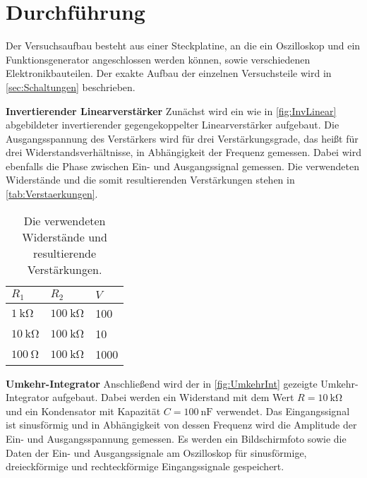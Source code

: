 \section{Durchführung}
Der Versuchsaufbau besteht aus einer Steckplatine, an die ein Oszilloskop und ein Funktionsgenerator angeschlossen werden können, sowie verschiedenen Elektronikbauteilen. Der exakte Aufbau der einzelnen Versuchsteile wird in \autoref{sec:Schaltungen} beschrieben.


\textbf{Invertierender Linearverstärker} \newline
Zunächst wird ein wie in \autoref{fig:InvLinear} abgebildeter invertierender gegengekoppelter Linearverstärker aufgebaut. Die Ausgangsspannung des Verstärkers wird für drei Verstärkungsgrade, das heißt für drei Widerstandsverhältnisse, in Abhängigkeit der Frequenz gemessen. %
Dabei wird ebenfalls die Phase zwischen Ein- und Ausgangssignal gemessen.
Die verwendeten Widerstände und die somit resultierenden Verstärkungen stehen in \autoref{tab:Verstaerkungen}.
\begin{table}
\centering
\begin{tabular}{lll}
    \hline
    $R_1$ & $R_2$ & $V$ \\
    \hline
    $\SI{1}{\kilo\ohm}$ & $\SI{100}{\kilo\ohm}$ & 100\\
    $\SI{10}{\kilo\ohm}$ & $\SI{100}{\kilo\ohm}$ & 10\\
    $\SI{100}{\ohm}$ & $\SI{100}{\kilo\ohm}$ & 1000\\
    \hline
\end{tabular}
\caption{Die verwendeten Widerstände und resultierende Verstärkungen.}
\label{tab:Verstaerkungen}
\end{table}


\textbf{Umkehr-Integrator} \newline
Anschließend wird der in \autoref{fig:UmkehrInt} gezeigte Umkehr-Integrator aufgebaut. Dabei werden ein Widerstand mit dem Wert $R = \SI{10}{\kilo\ohm}$ und ein Kondensator mit Kapazität $C = \SI{100}{\nano\farad}$ verwendet.
Das Eingangssignal ist sinusförmig und in Abhängigkeit von dessen Frequenz wird die Amplitude der Ein- und Ausgangsspannung gemessen.
Es werden ein Bildschirmfoto sowie die Daten der Ein- und Ausgangssignale am Oszilloskop für sinusförmige, dreieckförmige und rechteckförmige Eingangssignale gespeichert.



